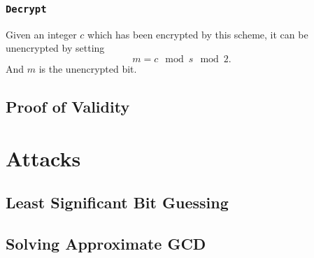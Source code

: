 \documentclass[a4paper,11pt, oneside]{article}
\begin{document}
\subsubsection{\texttt{Decrypt}}
Given an integer $c$ which has been encrypted by this scheme, it can be unencrypted by setting
\[
    m = c\mod{s}\mod{2}.
    \]
And $m$ is the unencrypted bit.

    \subsection{Proof of Validity}\label{proof}

    

\section{Attacks}

\subsection{Least Significant Bit Guessing}
\subsection{Solving Approximate GCD}
\end{document}
